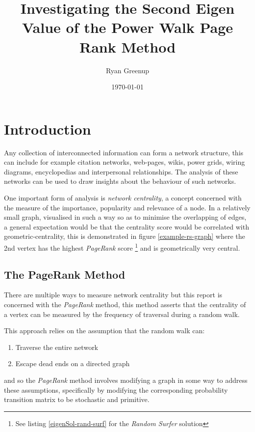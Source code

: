\documentclass[11pt]{report}
\author{Ryan Greenup}
\date{\today}
\title{Investigating the Second Eigen Value of the Power Walk Page Rank Method}
\begin{document}
\maketitle
\tableofcontents



\section{Introduction}
\label{sec:org93e4f0c}
Any collection of interconnected information can form a network structure,
this can include for example citation networks, web-pages, wikis, power grids, wiring diagrams, encyclopedias and interpersonal
relationships. The analysis of these networks can be used to draw insights about
the behaviour of such networks.

One important form of analysis is \emph{network centrality}, a concept concerned with
the measure of the importance, popularity and relevance of a node. In a
relatively small graph, visualised in such a way so as to minimise the
overlapping of edges, a general expectation would be that the centrality score
would be correlated with geometric-centrality, this is demonstrated in figure
\ref{example-rs-graph} where the 2nd vertex has the highest \emph{PageRank} score \footnote{See listing \ref{eigenSol-rand-surf} for the \textit{Random Surfer} solution } and
is geometrically very central.

\subsection{The PageRank Method}
\label{sec:org9a3667e}

There are multiple ways to measure network centrality but this report is
concerned with the \emph{PageRank} method, this method asserts that the centrality of
a vertex can be measured by the frequency of traversal during a random walk.

This approach relies on the assumption that the random walk can:

\begin{enumerate}
\item Traverse the entire network
\item Escape dead ends on a directed graph
\end{enumerate}


and so the \emph{PageRank} method involves modifying a graph in some way to address
these assumptions, specifically by modifying the corresponding probability
transition matrix to be stochastic and primitive.
\end{document}
